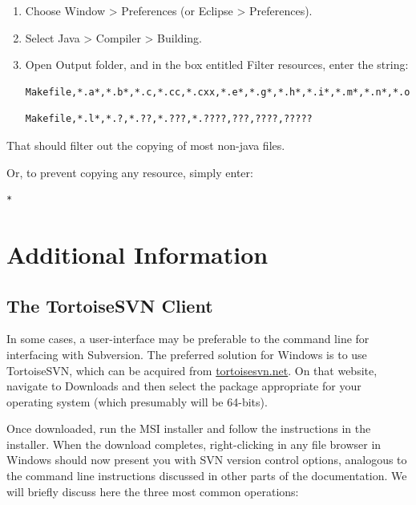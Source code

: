 \begin{enumerate}

\item Choose {\sf Window > Preferences} (or {\sf Eclipse > Preferences}).

\item Select {\sf Java > Compiler > Building}.

\item Open {\sf Output folder}, and in the box entitled {\sf Filter resources},
  enter the string:

\ifWindows
\begin{lstlisting}[]
    Makefile,*.a*,*.b*,*.c,*.cc,*.cxx,*.e*,*.g*,*.h*,*.i*,*.m*,*.n*,*.o*,*.r*,*.s*,*.t*
\end{lstlisting}
\else
\begin{lstlisting}[]
    Makefile,*.l*,*.?,*.??,*.???,*.????,???,????,?????
\end{lstlisting}
\fi

\end{enumerate}

That should filter out the copying of most non-java files.

Or, to prevent copying any resource, simply enter: 
\begin{lstlisting}[]
    *
\end{lstlisting}

\section{Additional Information}

\ifWindows
\subsection{The TortoiseSVN Client}
\label{TortoiseSVN}

In some cases, a user-interface may be preferable to the command line
for interfacing with Subversion. The preferred solution for Windows is
to use TortoiseSVN, which can be acquired from
\href{http://tortoisesvn.net}{tortoisesvn.net}. On that website,
navigate to {\sf Downloads} and then select the package appropriate
for your operating system (which presumably will be 64-bits).

Once downloaded, run the MSI installer and follow the instructions in
the installer. When the download completes, right-clicking in any file
browser in Windows should now present you with SVN version control
options, analogous to the command line instructions discussed in other
parts of the documentation. We will briefly discuss here the three
most common operations:


